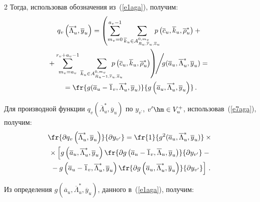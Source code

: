 \begin{multicols}{2}
     Тогда, использовав обозначения из~(\ref{e1aga}), получим:
     \begin{multline}
     q_v\left(\overline{\Lambda}^*_u, \overline{y}_u\right) = 
\left(\sum\limits_{m_v=0}^{a_v-1}\sum\limits_{\overline{k}_u \in 
A^{0,m_v}_{R_u, \overline{r}_u, \overline{a}_u}}\!\!\!\!\!\! p\left(\overline{c}_u, 
\overline{k}_u, \overline{\rho}_u^*\right)+{}\right.\\
\left.\hspace*{-5pt}{}+\sum\limits_{m_v=a_v}^{r_v+a_v-1} 
\sum\limits_{\overline{k}_u \in A^{0,m_v}_{R_u-1, \overline{r}_u, 
\overline{a}_u}}\!\!\!\!\!\!\!\!\!\!\!
p\left(\overline{c}_u, \overline{k}_u, \overline{\rho}_u^*\right)\right)\!\!\Bigg/\!\!
g(\overline{a}_u, \overline{\Lambda}^*_u, \overline{y}_u)={}\\
{}=
\fr{g(\overline{a}_u-\overline{1}_v,\overline{\Lambda}_u^*, 
\overline{y}_u)}{ g\left(\overline{a}_u, \overline{\Lambda}^*_u, \overline{y}_u\right) }\,.
     \label{e7aga}
     \end{multline}
      
     Для производной функции $q_v(\overline{\Lambda}_u^*, 
\overline{y}_u)$ по $y_{v^\prime}$, $v^\prime\hm\in V_u^+$, 
использовав~(\ref{e7aga}), получим:
     \begin{multline}
     \fr{\partial q_v\left(\overline{\Lambda}_u^*, \overline{y}_u\right)}{\partial 
y_{v^\prime}}=\fr{1}{g^2(\overline{a}_u, \overline{\Lambda}_u^*, 
\overline{y}_u)}\times{}\\
     {}\times \left[ g\left(\overline{a}_u, \overline{\Lambda}_u^*, 
\overline{y}_u\right)\fr{\partial g \left(\overline{a}_u-
\overline{1}_v,\overline{\Lambda}_u,\overline{y}_u\right)}{\partial y_{v^\prime}}-{}\right.\\
\left.{}-
g\left(\overline{a}_u-\overline{1}_v, \overline{\Lambda}_u^*, 
\overline{y}_u\right)\fr{\partial g \left(\overline{a}_u, \overline{\Lambda}_u^*, 
\overline{y}_u\right)}{\partial y_{v^\prime}}\right]\,.
     \label{e8aga}
     \end{multline}
     
     Из определения $g(\overline{a}_u, \overline{\Lambda}_u^*, 
\overline{y}_u)$, данного в~(\ref{e1aga}), получим:



\end{multicols}
